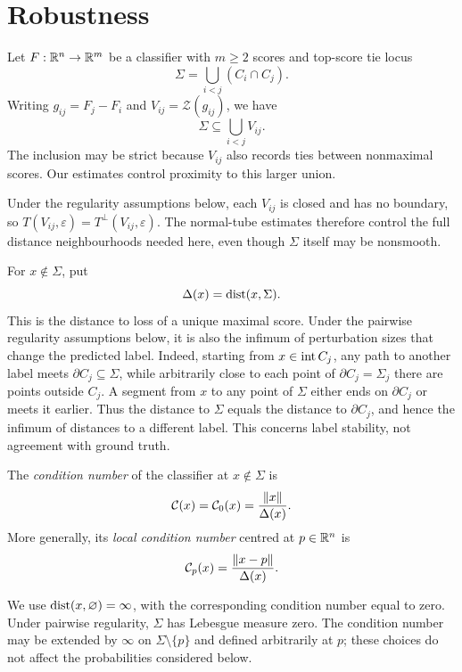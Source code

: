 \section{Robustness}\label{sec:robustness}
Let $F:\mathbb{R}^n\to\mathbb{R}^m$ be a classifier with $m\ge2$ scores and top-score tie locus
\[
\Sigma=\bigcup_{i<j}(C_i\cap C_j).
\]
Writing $g_{ij}=F_j-F_i$ and $V_{ij}=\mathcal Z(g_{ij})$, we have
\begin{equation}\label{eq:sigma-inclusion}
\Sigma\subseteq\bigcup_{i<j}V_{ij}.
\end{equation}
The inclusion may be strict because $V_{ij}$ also records ties between nonmaximal scores. Our estimates control proximity to this larger union.

Under the regularity assumptions below, each $V_{ij}$ is closed and has no boundary, so $T(V_{ij},\varepsilon)=T^\perp(V_{ij},\varepsilon)$. The normal-tube estimates therefore control the full distance neighbourhoods needed here, even though $\Sigma$ itself may be nonsmooth.

For $x\notin\Sigma$, put
\[
\Delta(x)=\operatorname{dist}(x,\Sigma).
\]
This is the distance to loss of a unique maximal score. Under the pairwise regularity assumptions below, it is also the infimum of perturbation sizes that change the predicted label. Indeed, starting from $x\in\operatorname{int} C_j$, any path to another label meets $\partial C_j\subseteq\Sigma$, while arbitrarily close to each point of $\partial C_j=\Sigma_j$ there are points outside $C_j$. A segment from $x$ to any point of $\Sigma$ either ends on $\partial C_j$ or meets it earlier. Thus the distance to $\Sigma$ equals the distance to $\partial C_j$, and hence the infimum of distances to a different label. This concerns label stability, not agreement with ground truth.

\begin{definition}\label{def:condition}
The \emph{condition number} of the classifier at $x\notin\Sigma$ is
\[
\mathcal{C}(x)=\mathcal{C}_0(x)=\frac{\|x\|}{\Delta(x)}.
\]
More generally, its \emph{local condition number} centred at $p\in\mathbb{R}^n$ is
\[
\mathcal{C}_p(x)=\frac{\|x-p\|}{\Delta(x)}.
\]
\end{definition}

We use $\operatorname{dist}(x,\varnothing)=\infty$, with the corresponding condition number equal to zero. Under pairwise regularity, $\Sigma$ has Lebesgue measure zero. The condition number may be extended by $\infty$ on $\Sigma\setminus\{p\}$ and defined arbitrarily at $p$; these choices do not affect the probabilities considered below.

